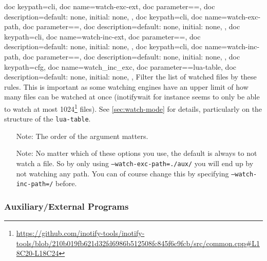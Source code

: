 \documentclass[a4paper, 11pt]{scrartcl}
\begin{document}
\begin{docKeys}[
	]{
		{
			doc keypath=cli,
			doc name=watch-exc-ext,
			doc parameter={=},
			doc description={default: none, initial: none},
		},
		{
			doc keypath=cli,
			doc name=watch-exc-path,
			doc parameter={=},
			doc description={default: none, initial: none},
		},
		{
			doc keypath=cli,
			doc name=watch-inc-ext,
			doc parameter={=},
			doc description={default: none, initial: none},
		},
		{
			doc keypath=cli,
			doc name=watch-inc-path,
			doc parameter={=},
			doc description={default: none, initial: none},
		},
		{
			doc keypath=cfg,
			doc name=watch_inc_exc,
			doc parameter={=lua-table},
			doc description={default: none, initial: none},
		},
	}
	Filter the list of watched files by these rules.
	This is important as some watching engines have an upper limit of how many files can be watched at once (inotifywait for instance seems to only be able to watch at most 1024\footnote{\url{https://github.com/inotify-tools/inotify-tools/blob/210b019fb621d32fd6986b512508fc845f6c9fcb/src/common.cpp\#L18C20-L18C24}} files).
	See \cref{sec:watch-mode} for details, particularly on the structure of the \texttt{lua-table}.

	\begin{itemize}
		\item[Note:] The order of the argument matters.
		\item[Note:] No matter which of these options you use, the default is always to not watch a file.
			So by only using \texttt{--watch-exc-path=./aux/} you will end up by not watching any path.
			You can of course change this by specifying \texttt{--watch-inc-path=/} before.
	\end{itemize}
\end{docKeys}

\subsubsection{Auxiliary/External Programs}
\end{document}
